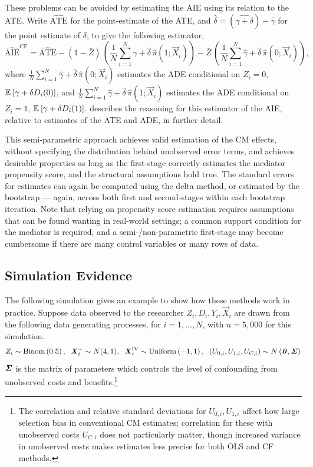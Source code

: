 These problems can be avoided by estimating the AIE using its relation to the ATE.
Write $\hat{\text{ATE}}$ for the point-estimate of the ATE, and 
$\hat\delta = (\hat{\gamma + \delta}) - \hat\gamma$ for the point estimate of $\delta$, to give the following estimator,
\[ \hat{\text{AIE}}^{\text{CF}}
    = \hat{\text{ATE}}
    - (1 - \bar Z) \, \left( 
        \frac 1N \sum_{i = 1}^N \hat\gamma + \hat \delta \, \hat\pi(1; \vec X_i) \right)
    - \bar Z \, \left(
        \frac 1N \sum_{i = 1}^N \hat\gamma + \hat \delta \, \hat\pi(0; \vec X_i)  \right), \]
where $\frac 1N \sum_{i = 1}^N \hat\gamma + \hat \delta \, \hat\pi(0; \vec X_i)$ estimates the ADE conditional on $Z_i = 0$, $\mathbb{E}_{} \left[ \gamma + \delta D_i(0) \right]$, and $\frac 1N \sum_{i = 1}^N \hat\gamma + \hat \delta \, \hat\pi(1; \vec X_i)$ estimates the ADE conditional on $Z_i = 1$, $\mathbb{E}_{} \left[ \gamma + \delta D_i(1) \right]$.
 describes the reasoning for this estimator of the AIE, relative to estimates of the ATE and ADE, in further detail.

This semi-parametric approach achieves valid estimation of the CM effects, without specifying the distribution behind unobserved error terms, and achieves desirable properties as long as the first-stage correctly estimates the mediator propensity score, and the structural assumptions hold true.
The standard errors for estimates can again be computed using the delta method, or estimated by the bootstrap --- again, across both first and second-stages within each bootstrap iteration.
Note that relying on propensity score estimation requires assumptions that can be found wanting in real-world settings; a common support condition for the mediator is required, and a semi-/non-parametric first-stage may become cumbersome if there are many control variables or many rows of data.

\subsection{Simulation Evidence}
\label{sec:simulations}
The following simulation gives an example to show how these methods work in practice.
Suppose data observed to the researcher $Z_i, D_i, Y_i, \vec X_i$ are drawn from the following data generating processes, for $i = 1, \hdots, N$, with 
$n = 5,000$ for this simulation.
\[ Z_i \sim \text{Binom}\left(0.5 \right),
    \;\; \boldsymbol{\mathit{X}}_i^- \sim N(4, 1),
    \;\; \boldsymbol{\mathit{X}}_i^{\text{IV}} \sim \text{Uniform}\left( -1, 1 \right),
    \;\; \left( U_{0,i}, U_{1,i}, U_{C,i} \right) \sim
    N\left( \boldsymbol{\mathit{0}}, \boldsymbol{\mathit{\Sigma}} \right) \]
$\boldsymbol{\mathit{\Sigma}}$ is the matrix of parameters which controls the level of confounding from unobserved costs and benefits.\footnote{
    The correlation and relative standard deviations for $U_{0,i}, U_{1,i}$ affect how large selection bias in conventional CM estimates; correlation for these with unobserved costs $U_{C,i}$ does not particularly matter, though increased variance in unobserved costs makes estimates less precise for both OLS and CF methods.
}


